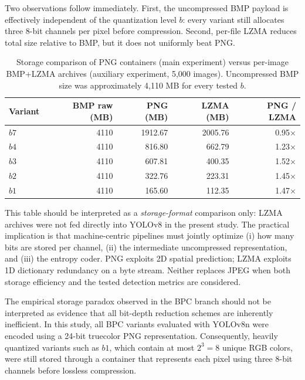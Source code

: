 \documentclass[12pt, a4paper]{article}
\begin{document}
Two observations follow immediately. First, the uncompressed BMP payload is effectively independent of the quantization level $b$: every variant still allocates three 8-bit channels per pixel before compression. Second, per-file LZMA reduces total size relative to BMP, but it does not uniformly beat PNG.

\begin{table}[h]
\centering
\caption{Storage comparison of PNG containers (main experiment) versus per-image BMP+LZMA archives (auxiliary experiment, 5,000 images). Uncompressed BMP size was approximately 4,110 MB for every tested $b$.}
\label{tab:lzma_png_storage}
\begin{tabular}{|l|r|r|r|r|}
\hline
\textbf{Variant} & \textbf{BMP raw (MB)} & \textbf{PNG (MB)} & \textbf{LZMA (MB)} & \textbf{PNG / LZMA} \\ \hline
$b7$ & 4110 & 1912.67 & 2005.76 & 0.95$\times$ \\ \hline
$b4$ & 4110 & 816.80 & 662.79 & 1.23$\times$ \\ \hline
$b3$ & 4110 & 607.81 & 400.35 & 1.52$\times$ \\ \hline
$b2$ & 4110 & 322.76 & 223.31 & 1.45$\times$ \\ \hline
$b1$ & 4110 & 165.60 & 112.35 & 1.47$\times$ \\ \hline
\end{tabular}
\end{table}

This table should be interpreted as a \textit{storage-format} comparison only: LZMA archives were not fed directly into YOLOv8 in the present study. The practical implication is that machine-centric pipelines must jointly optimize (i) how many bits are stored per channel, (ii) the intermediate uncompressed representation, and (iii) the entropy coder. PNG exploits 2D spatial prediction; LZMA exploits 1D dictionary redundancy on a byte stream. Neither replaces JPEG when both storage efficiency and the tested detection metrics are considered.

The empirical storage paradox observed in the BPC branch should not be interpreted as evidence that all bit-depth reduction schemes are inherently inefficient. In this study, all BPC variants evaluated with YOLOv8n were encoded using a 24-bit truecolor PNG representation. Consequently, heavily quantized variants such as $b1$, which contain at most $2^3=8$ unique RGB colors, were still stored through a container that represents each pixel using three 8-bit channels before lossless compression.
\end{document}
